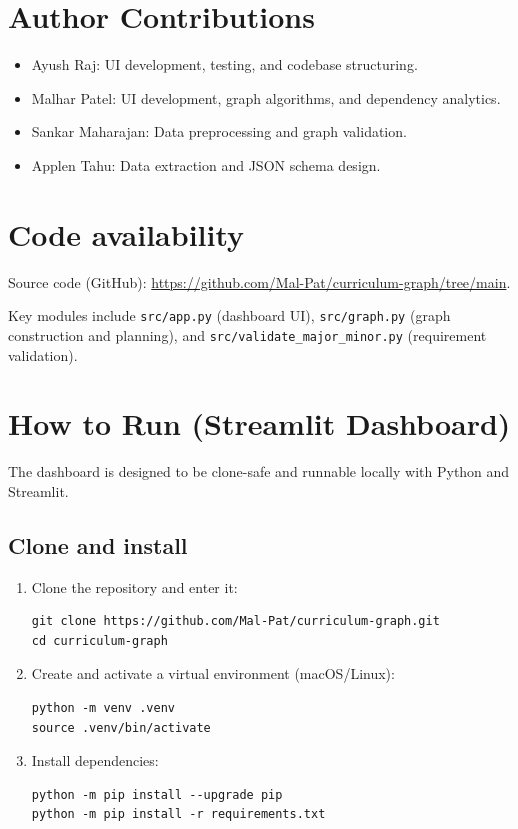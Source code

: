 \section{Author Contributions}
\begin{itemize}
    \item Ayush Raj: UI development, testing, and codebase structuring.
    \item Malhar Patel: UI development, graph algorithms, and dependency analytics.
    \item Sankar Maharajan: Data preprocessing and graph validation.
    \item Applen Tahu: Data extraction and JSON schema design.
\end{itemize}

\section{Code availability}
Source code (GitHub): \url{https://github.com/Mal-Pat/curriculum-graph/tree/main}.

Key modules include \texttt{src/app.py} (dashboard UI), \texttt{src/graph.py}
(graph construction and planning), and \texttt{src/validate\_major\_minor.py}
(requirement validation).

\section{How to Run (Streamlit Dashboard)}
The dashboard is designed to be clone-safe and runnable locally with Python and
Streamlit.

\subsection{Clone and install}
\begin{enumerate}
    \item Clone the repository and enter it:
    \begin{verbatim}
git clone https://github.com/Mal-Pat/curriculum-graph.git
cd curriculum-graph
    \end{verbatim}

    \item Create and activate a virtual environment (macOS/Linux):
    \begin{verbatim}
python -m venv .venv
source .venv/bin/activate
    \end{verbatim}

    \item Install dependencies:
    \begin{verbatim}
python -m pip install --upgrade pip
python -m pip install -r requirements.txt
    \end{verbatim}
\end{enumerate}

